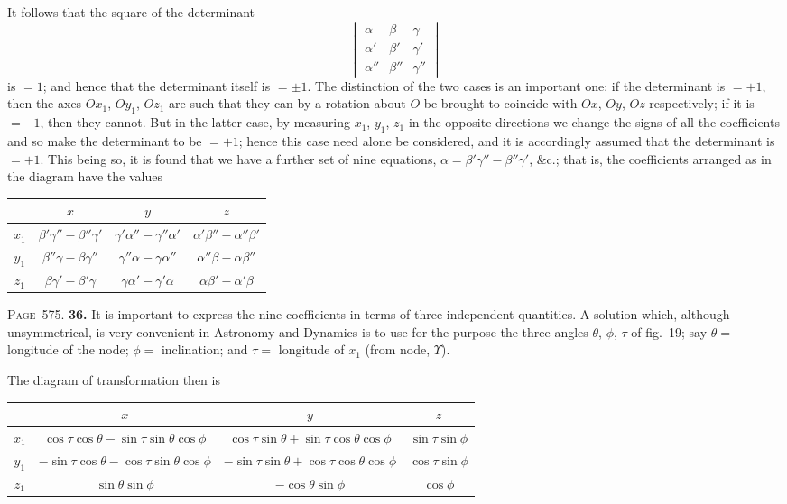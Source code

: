 \documentclass[11pt,a4paper]{article}
\theoremstyle{definition}
\begin{document}
It follows that the square of the determinant
\[
\begin{vmatrix}
\alpha & \beta & \gamma \\
\alpha' & \beta' & \gamma' \\
\alpha'' & \beta'' & \gamma''
\end{vmatrix}
\]
is $=1$; and hence that the determinant itself is $=\pm 1$. The distinction of the two cases is an important one: if the determinant is $=+1$, then the axes $Ox_1$, $Oy_1$, $Oz_1$ are such that they can by a rotation about $O$ be brought to coincide with $Ox$, $Oy$, $Oz$ respectively; if it is $=-1$, then they cannot. But in the latter case, by measuring $x_1$, $y_1$, $z_1$ in the opposite directions we change the signs of all the coefficients and so make the determinant to be $=+1$; hence this case need alone be considered, and it is accordingly assumed that the determinant is $=+1$. This being so, it is found that we have a further set of nine equations, $\alpha=\beta'\gamma''-\beta''\gamma'$, \&c.; that is, the coefficients arranged as in the diagram have the values
\begin{center}
\begin{tabular}{c|ccc}
& $x$ & $y$ & $z$ \\
\hline
$x_1$ & $\beta'\gamma''-\beta''\gamma'$ & $\gamma'\alpha''-\gamma''\alpha'$ & $\alpha'\beta''-\alpha''\beta'$ \\
$y_1$ & $\beta''\gamma-\beta\gamma''$ & $\gamma''\alpha-\gamma\alpha''$ & $\alpha''\beta-\alpha\beta''$ \\
$z_1$ & $\beta\gamma'-\beta'\gamma$ & $\gamma\alpha'-\gamma'\alpha$ & $\alpha\beta'-\alpha'\beta$ \\
\end{tabular}
\end{center}

\newpage
\noindent\textsc{Page~575.} \textbf{36.} It is important to express the nine coefficients in terms of three independent quantities. A solution which, although unsymmetrical, is very convenient in Astronomy and Dynamics is to use for the purpose the three angles $\theta$, $\phi$, $\tau$ of fig.~19; say $\theta=$ longitude of the node; $\phi=$ inclination; and $\tau=$ longitude of $x_1$ (from node, $\Upsilon$).

The diagram of transformation then is
\begin{center}
\begin{tabular}{c|ccc}
& $x$ & $y$ & $z$ \\
\hline
$x_1$ & $\cos\tau\cos\theta-\sin\tau\sin\theta\cos\phi$ & $\cos\tau\sin\theta+\sin\tau\cos\theta\cos\phi$ & $\sin\tau\sin\phi$ \\
$y_1$ & $-\sin\tau\cos\theta-\cos\tau\sin\theta\cos\phi$ & $-\sin\tau\sin\theta+\cos\tau\cos\theta\cos\phi$ & $\cos\tau\sin\phi$ \\
$z_1$ & $\sin\theta\sin\phi$ & $-\cos\theta\sin\phi$ & $\cos\phi$ \\
\end{tabular}
\end{center}
\end{document}
